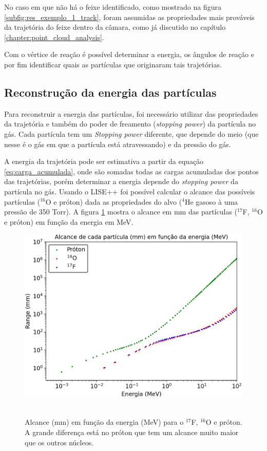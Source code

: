\documentclass[a4paper,12pt,oneside]{book}
\begin{document}
\par No caso em que não há o feixe identificado, como mostrado na figura \ref{subfig:res_exemplo_1_track}, foram assumidas as propriedades mais prováveis da trajetória do feixe dentro da câmara, como já discutido no capítulo \ref{chapter:point_cloud_analysis}.

\par Com o vértice de reação é possível determinar a energia, os ângulos de reação e por fim identificar quais as partículas que originaram tais trajetórias.

\subsection{Reconstrução da energia das partículas}

\par Para reconstruir a energia das partículas, foi necessário utilizar das propriedades da trajetória e também do poder de freamento (\textit{stopping power}) \cite{DETC_TELE} da partícula no gás. Cada partícula tem um  \textit{Stopping power} diferente, que depende do meio (que nesse é o gás em que a partícula está atravessando) e da pressão do gás.

\par A energia da trajetória pode ser estimativa a partir da equação \ref{eq:carga_acumulada}, onde são somadas todas as cargas acumuladas dos pontos das trajetórias, porém determinar a energia depende do \textit{stopping power} da partícula no gás. Usando o LISE++ \cite{lise++} foi possível calcular o alcance das possíveis partículas ($^{16}$O e próton) dada as propriedades do alvo ($^4$He gasoso à uma pressão de 350 Torr). A figura \ref{fig:alcance_vs_energia} mostra o alcance em mm das partículas ($^{17}$F, $^{16}$O e próton) em função da energia em MeV. 

 \begin{figure}[H]
     \centering
     \includegraphics[scale = 0.75]{figs/alcance_vs_energia_2.png}\
     \caption{Alcance (mm) em função da energia (MeV) para o $^{17}$F, $^{16}$O e próton. A grande diferença está no próton que tem um alcance muito maior que os outros núcleos.}
     \label{fig:alcance_vs_energia}
 \end{figure}
\end{document}
